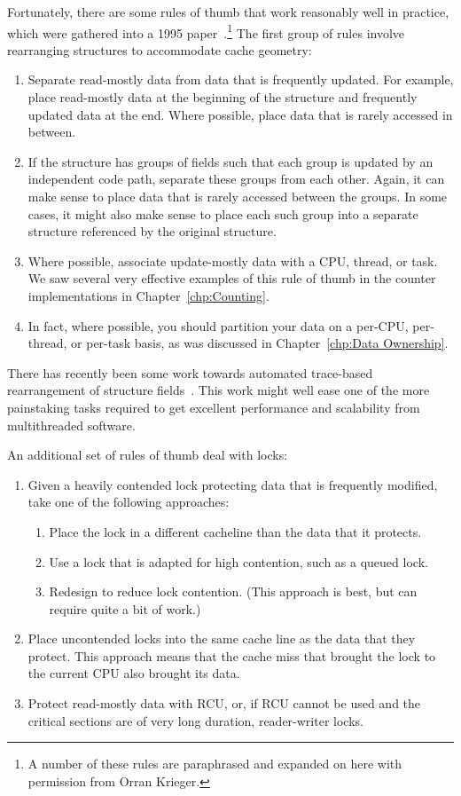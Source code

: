 Fortunately, there are some rules of thumb that work reasonably well in
practice, which were gathered into a 1995
paper~\cite{BenjaminGamsa95a}.\footnote{
	A number of these rules are paraphrased and expanded on here
	with permission from Orran Krieger.}
The first group of rules involve rearranging structures to accommodate
cache geometry:

\begin{enumerate}
\item	Separate read-mostly data from data that is frequently updated.
	For example, place read-mostly data at the beginning of the
	structure and frequently updated data at the end.
	Where possible, place data that is rarely accessed in between.
\item	If the structure has groups of fields such that each group is
	updated by an independent code path, separate these groups
	from each other.
	Again, it can make sense to place data that is rarely accessed
	between the groups.
	In some cases, it might also make sense to place each such group
	into a separate structure referenced by the original structure.
\item	Where possible, associate update-mostly data with a CPU, thread,
	or task.
	We saw several very effective examples of this rule of thumb
	in the counter implementations in
	Chapter~\ref{chp:Counting}.
\item	In fact, where possible, you should partition your data on
	a per-CPU, per-thread, or per-task basis, as was discussed
	in Chapter~\ref{chp:Data Ownership}.
\end{enumerate}

There has recently been some work towards automated trace-based
rearrangement of structure
fields~\cite{Golovanevsky:2010:TDL:2174824.2174835}.
This work might well ease one of the more painstaking tasks
required to get excellent performance and scalability from
multithreaded software.

An additional set of rules of thumb deal with locks:

\begin{enumerate}
\item	Given a heavily contended lock protecting data that is
	frequently modified, take one of the following approaches:
	\begin{enumerate}
	\item	Place the lock in a different cacheline than the data
		that it protects.
	\item	Use a lock that is adapted for high contention, such
		as a queued lock.
	\item	Redesign to reduce lock contention.
		(This approach is best, but can require quite a bit
		of work.)
	\end{enumerate}
\item	Place uncontended locks into the same cache line as the data
	that they protect.
	This approach means that the cache miss that brought the
	lock to the current CPU also brought its data.
\item	Protect read-mostly data with RCU, or, if RCU cannot be used and
	the critical sections are of very long duration, reader-writer locks.
\end{enumerate}

